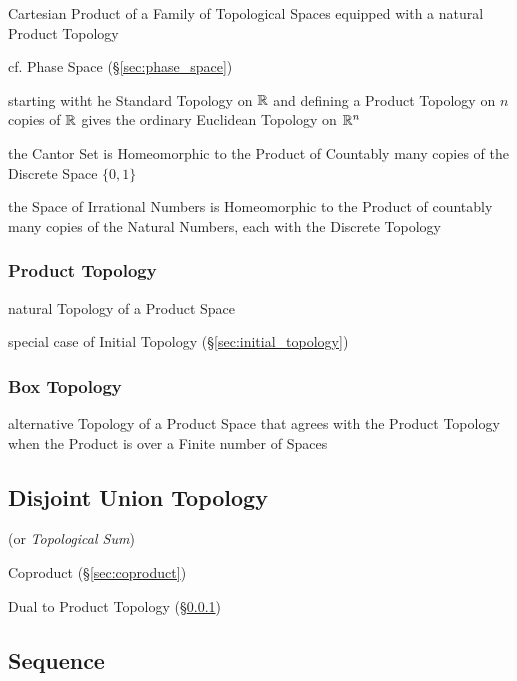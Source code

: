 Cartesian Product of a Family of Topological Spaces equipped with a natural
Product Topology

cf. Phase Space (\S\ref{sec:phase_space})

starting witht he Standard Topology on $\mathbb{R}$ and defining a Product Topology
on $n$ copies of $\mathbb{R}$ gives the ordinary Euclidean Topology on $\mathbb{R}^n$

the Cantor Set is Homeomorphic to the Product of Countably many copies of the
Discrete Space $\{0,1\}$

the Space of Irrational Numbers is Homeomorphic to the Product of countably many
copies of the Natural Numbers, each with the Discrete Topology



\subsubsection{Product Topology}\label{sec:product_topology}

natural Topology of a Product Space

special case of Initial Topology (\S\ref{sec:initial_topology})



\subsubsection{Box Topology}\label{sec:box_topology}

alternative Topology of a Product Space that agrees with the Product Topology
when the Product is over a Finite number of Spaces



\subsection{Disjoint Union Topology}\label{sec:disjoint_union_topology}

(or \emph{Topological Sum})

Coproduct (\S\ref{sec:coproduct})

Dual to Product Topology (\S\ref{sec:product_topology})



\subsection{Sequence}\label{sec:sequence_topology}

